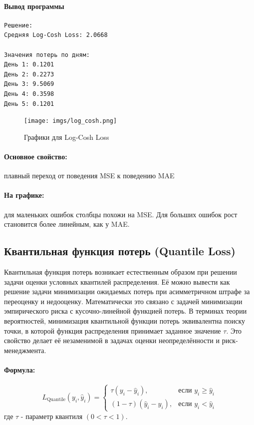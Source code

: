 \paragraph{Вывод программы}
\begin{verbatim}
Решение:
Средняя Log-Cosh Loss: 2.0668

Значения потерь по дням:
День 1: 0.1201
День 2: 0.2273
День 3: 9.5069
День 4: 0.3598
День 5: 0.1201
\end{verbatim}
\begin{figure}[h!]
    \centering
    \texttt{[image: imgs/log\_cosh.png]}
    \caption{Графики для Log-Cosh Loss}
\end{figure}

\paragraph{Основное свойство:} плавный переход от поведения MSE к поведению MAE

\paragraph{На графике:} для маленьких ошибок столбцы похожи на MSE. Для больших ошибок рост становится более линейным, как у MAE.

\subsection{Квантильная функция потерь (Quantile Loss)}

Квантильная функция потерь возникает естественным образом при решении задачи оценки условных квантилей распределения. Её можно вывести как решение задачи минимизации ожидаемых потерь при асимметричном штрафе за переоценку и недооценку. Математически это связано с задачей минимизации эмпирического риска с кусочно-линейной функцией потерь. В терминах теории вероятностей, минимизация квантильной функции потерь эквивалентна поиску точки, в которой функция распределения принимает заданное значение $\tau$. Это свойство делает её незаменимой в задачах оценки неопределённости и риск-менеджмента.

\paragraph{Формула:}

\[
L_{\text{Quantile}}(y_i, \hat{y}_i) = 
\begin{cases} 
\tau (y_i - \hat{y}_i), & \text{если } y_i \geq \hat{y}_i \\
(1 - \tau) (\hat{y}_i - y_i), & \text{если } y_i < \hat{y}_i
\end{cases}
\]
где $\tau$ - параметр квантиля $(0 < \tau < 1)$.

